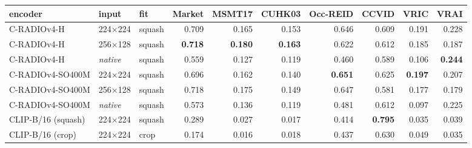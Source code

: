\begin{tabular}{lllrrrrrrr}
\toprule
encoder & input & fit & Market & MSMT17 & CUHK03 & Occ-REID & CCVID & VRIC & VRAI \\
\midrule
C-RADIOv4-H & 224$\times$224 & squash & 0.709 & 0.165 & 0.153 & 0.646 & 0.609 & 0.191 & 0.228 \\
C-RADIOv4-H & 256$\times$128 & squash & \textbf{0.718} & \textbf{0.180} & \textbf{0.163} & 0.622 & 0.612 & 0.185 & 0.187 \\
C-RADIOv4-H & \textit{native} & squash & 0.559 & 0.127 & 0.119 & 0.460 & 0.589 & 0.106 & \textbf{0.244} \\
\midrule
C-RADIOv4-SO400M & 224$\times$224 & squash & 0.696 & 0.162 & 0.140 & \textbf{0.651} & 0.625 & \textbf{0.197} & 0.207 \\
C-RADIOv4-SO400M & 256$\times$128 & squash & 0.718 & 0.175 & 0.149 & 0.647 & 0.581 & 0.177 & 0.179 \\
C-RADIOv4-SO400M & \textit{native} & squash & 0.573 & 0.136 & 0.119 & 0.481 & 0.612 & 0.097 & 0.225 \\
\midrule
CLIP-B/16 (squash) & 224$\times$224 & squash & 0.289 & 0.027 & 0.017 & 0.414 & \textbf{0.795} & 0.035 & 0.039 \\
CLIP-B/16 (crop) & 224$\times$224 & crop & 0.174 & 0.016 & 0.018 & 0.437 & 0.630 & 0.049 & 0.035 \\
\bottomrule
\end{tabular}
